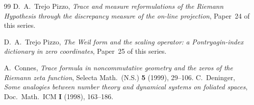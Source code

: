 \documentclass[11pt]{amsart}
\theoremstyle{definition}
\theoremstyle{remark}
\begin{document}
\begin{thebibliography}{99}
 D.~A.~Trejo Pizzo, \emph{Trace and measure reformulations of the Riemann
Hypothesis through the discrepancy measure of the on-line projection}, Paper~24 of this series.

 D.~A.~Trejo Pizzo, \emph{The Weil form and the scaling operator: a
Pontryagin-index dictionary in zero coordinates}, Paper~25 of this series.

 A.~Connes, \emph{Trace formula in noncommutative geometry and the zeros of
the Riemann zeta function}, Selecta Math.\ (N.S.) \textbf{5} (1999), 29--106.
 C.~Deninger, \emph{Some analogies between number theory and dynamical
systems on foliated spaces}, Doc.\ Math.\ ICM \textbf{I} (1998), 163--186.
\end{thebibliography}
\end{document}
